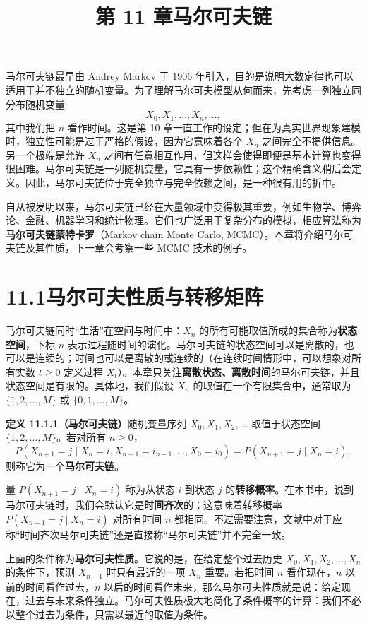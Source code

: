 \documentclass[UTF8, 12pt, fontset=fandol, oneside]{ctexart}
\title{第 11 章\quad 马尔可夫链}
\author{}
\date{}
\begin{document}
\maketitle

马尔可夫链最早由 Andrey Markov 于 1906 年引入，目的是说明大数定律也可以适用于并不独立的随机变量。为了理解马尔可夫模型从何而来，先考虑一列独立同分布随机变量
\[
  X_0,X_1,\ldots,X_n,\ldots,
\]
其中我们把 $n$ 看作时间。这是第 10 章一直工作的设定；但在为真实世界现象建模时，独立性可能是过于严格的假设，因为它意味着各个 $X_n$ 之间完全不提供信息。另一个极端是允许 $X_n$ 之间有任意相互作用，但这样会使得即便是基本计算也变得很困难。马尔可夫链是一列随机变量，它具有一步依赖性；这个精确含义稍后会定义。因此，马尔可夫链位于完全独立与完全依赖之间，是一种很有用的折中。

自从被发明以来，马尔可夫链已经在大量领域中变得极其重要，例如生物学、博弈论、金融、机器学习和统计物理。它们也广泛用于复杂分布的模拟，相应算法称为\textbf{马尔可夫链蒙特卡罗}（Markov chain Monte Carlo, MCMC）。本章将介绍马尔可夫链及其性质，下一章会考察一些 MCMC 技术的例子。

\section*{11.1\quad 马尔可夫性质与转移矩阵}

马尔可夫链同时“生活”在空间与时间中：$X_n$ 的所有可能取值所成的集合称为\textbf{状态空间}，下标 $n$ 表示过程随时间的演化。马尔可夫链的状态空间可以是离散的，也可以是连续的；时间也可以是离散的或连续的（在连续时间情形中，可以想象对所有实数 $t\ge 0$ 定义过程 $X_t$）。本章只关注\textbf{离散状态、离散时间}的马尔可夫链，并且状态空间是有限的。具体地，我们假设 $X_n$ 的取值在一个有限集合中，通常取为 $\{1,2,\ldots,M\}$ 或 $\{0,1,\ldots,M\}$。

\noindent\textbf{定义 11.1.1（马尔可夫链）}\quad 随机变量序列 $X_0,X_1,X_2,\ldots$ 取值于状态空间 $\{1,2,\ldots,M\}$。若对所有 $n\ge0$，
\[
  P(X_{n+1}=j\mid X_n=i,X_{n-1}=i_{n-1},\ldots,X_0=i_0)
  =
  P(X_{n+1}=j\mid X_n=i),
\]
则称它为一个\textbf{马尔可夫链}。

量 $P(X_{n+1}=j\mid X_n=i)$ 称为从状态 $i$ 到状态 $j$ 的\textbf{转移概率}。在本书中，说到马尔可夫链时，我们会默认它是\textbf{时间齐次}的；这意味着转移概率 $P(X_{n+1}=j\mid X_n=i)$ 对所有时间 $n$ 都相同。不过需要注意，文献中对于应称“时间齐次马尔可夫链”还是直接称“马尔可夫链”并不完全一致。

上面的条件称为\textbf{马尔可夫性质}。它说的是，在给定整个过去历史 $X_0,X_1,X_2,\ldots,X_n$ 的条件下，预测 $X_{n+1}$ 时只有最近的一项 $X_n$ 重要。若把时间 $n$ 看作现在，$n$ 以前的时间看作过去，$n$ 以后的时间看作未来，那么马尔可夫性质就是说：给定现在，过去与未来条件独立。马尔可夫性质极大地简化了条件概率的计算：我们不必以整个过去为条件，只需以最近的取值为条件。
\end{document}
